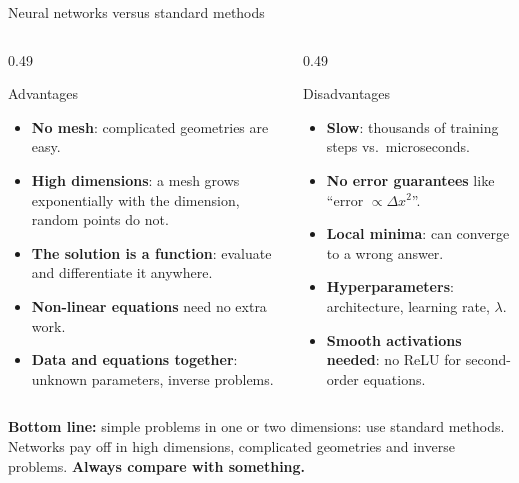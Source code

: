 \documentclass[10pt,aspectratio=169]{beamer}
\begin{document}
\begin{frame}{Neural networks versus standard methods}
\begin{columns}[T]
\begin{column}{0.49\textwidth}
\begin{block}{Advantages}
\small
\begin{itemize}
  \item \textbf{No mesh}: complicated geometries are easy.
  \item \textbf{High dimensions}: a mesh grows exponentially with the
        dimension, random points do not.
  \item \textbf{The solution is a function}: evaluate and differentiate it
        anywhere.
  \item \textbf{Non-linear equations} need no extra work.
  \item \textbf{Data and equations together}: unknown parameters, inverse
        problems.
\end{itemize}
\end{block}
\end{column}
\begin{column}{0.49\textwidth}
\begin{block}{Disadvantages}
\small
\begin{itemize}
  \item \textbf{Slow}: thousands of training steps vs.\ microseconds.
  \item \textbf{No error guarantees} like ``error $\propto\Delta x^{2}$''.
  \item \textbf{Local minima}: can converge to a wrong answer.
  \item \textbf{Hyperparameters}: architecture, learning rate,
        $\lambda$.
  \item \textbf{Smooth activations needed}: no ReLU for second-order
        equations.
\end{itemize}
\end{block}
\end{column}
\end{columns}
\vspace{6pt}
\textbf{Bottom line:} simple problems in one or two dimensions: use
standard methods.  Networks pay off in high dimensions, complicated
geometries and inverse problems.  \textbf{Always compare with something.}
\end{frame}
\end{document}
